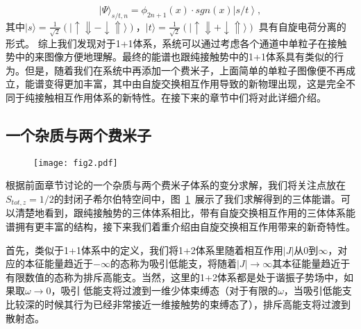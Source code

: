 \begin{equation}
|\Psi\rangle_{s/t,n} = \phi_{2n+1}(x) \cdot sgn(x)\left| s/t \right>, \label{asymptotic_wf}
\end{equation}
其中$|s\rangle = \frac{1}{\sqrt{2}}(|\uparrow\Downarrow - \downarrow\Uparrow\rangle)$，$|t\rangle = \frac{1}{\sqrt{2}}(|\uparrow\Downarrow + \downarrow\Uparrow\rangle)$ 具有自旋电荷分离的形式。
综上我们发现对于1+1体系，系统可以通过考虑各个通道中单粒子在接触势中的来图像方便地理解。最终的能谱也跟纯接触势中的1+1体系\cite{busch1998two}具有类似的行为。但是，随着我们在系统中再添加一个费米子，上面简单的单粒子图像便不再成立，能谱变得更加丰富，其中由自旋交换相互作用导致的新物理出现，这是完全不同于纯接触相互作用体系的新特性。在接下来的章节中们将对此详细介绍。

\subsection{一个杂质与两个费米子}

\begin{figure}[!htbp]
    \centering
    \texttt{[image: fig2.pdf]}
    \label{fig:fig2}
\end{figure}
根据前面章节讨论的一个杂质与两个费米子体系的变分求解，我们将关注点放在$S_{tot,z}=1/2$的封闭子希尔伯特空间中，图~\ref{fig:fig2}~展示了我们求解得到的三体能谱。可以清楚地看到，跟纯接触势的三体体系相比，带有自旋交换相互作用的三体体系能谱拥有更丰富的结构，接下来我们着重介绍由自旋交换相互作用带来的新奇特性。

首先，类似于1+1体系中的定义，我们将1+2体系里随着相互作用$|J|$从$0$到$\infty$，对应的本征能量趋近于$-\infty$的态称为吸引低能支，将随着$|J|\to\infty$其本征能量趋近于有限数值的态称为排斥高能支。当然，这里的1+2体系都是处于谐振子势场中，如果取$\omega\to 0$，吸引
低能支将过渡到一维少体束缚态（对于有限的$\omega$，当吸引低能支比较深的时候其行为已经非常接近一维接触势的束缚态了），排斥高能支将过渡到散射态。

